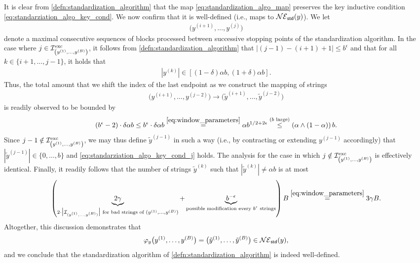 \documentclass[11pt]{amsart}
\numberwithin{equation}{section}
\numberwithin{equation}{section}
\newcommand{\1}{\mathbbm{1}}
\newcommand{\std}{\textup{\textsf{std}}}
\newcommand{\exc}{\textup{exc}}
\theoremstyle{definition}
\begin{document}
It is clear from \cref{defn:standardization_algorithm} that the map \eqref{eq:standardization_algo_map} preserves the key inductive condition \eqref{eq:standarziation_algo_key_cond}. We now confirm that it is well-defined (i.e., maps to $\mathcal{NE}_\std(y)$). We let
\begin{align*}
    \big(y^{(i+1)},\ldots,y^{(j)}\big)
\end{align*}
denote a maximal consecutive sequences of blocks processed between successive stopping points of the standardization algorithm. In the case where $j \in \mathcal I_{\left(y^{(1)}, \dots, y^{(B)}\right)}^\exc$, it follows from \cref{defn:standardization_algorithm} that $|(j-1)-(i+1)+1| \leq b^\epsilon$ and that for all $k \in \{ i+1, \dots, j-1 \}$, it holds that
\begin{align*}
    |y^{(k)}| \in \left[ (1-\delta)\alpha b, (1+\delta)\alpha b \right].
\end{align*}
Thus, the total amount that we shift the index of the last endpoint as we construct the mapping of strings
\begin{align*}
    \big(y^{(i+1)}, \dots, y^{(j-2)}\big) \to \big(\tilde{y}^{(i+1)}, \dots, \tilde{y}^{(j-2)}\big)
\end{align*}
is readily observed to be bounded by
\begin{align} \label{eq:total_shift}
    (b^\epsilon-2) \cdot \delta \alpha b \leq b^\epsilon \cdot \delta \alpha b \stackrel{\eqref{eq:window_parameters}}{=} \alpha b^{1/2+2\epsilon} \stackrel{\text{($b$ large)}}{\leq} \left( \alpha \land (1-\alpha) \right)b.
\end{align}
Since $j-1 \notin \mathcal I_{\left(y^{(1)}, \dots, y^{(B)}\right)}^\exc$, we may thus define $\tilde{y}^{(j-1)}$ in such a way (i.e., by contracting or extending $y^{(j-1)}$ accordingly) that $|\tilde{y}^{(j-1)}| \in \{0, \dots, b\}$ and \eqref{eq:standarziation_algo_key_cond_j} holds. The analysis for the case in which $j \notin \mathcal I_{\left(y^{(1)}, \dots, y^{(B)}\right)}^\exc$ is effectively identical. Finally, it readily follows that the number of strings $\tilde{y}^{(k)}$ such that $|\tilde{y}^{(k)}| \neq \alpha b$ is at most
\begin{align*}
    \left( \underbrace{2\gamma}_{2 \cdot \big|\mathcal I_{(y^{(1)}, \dots, y^{(B)})} \big| \text{ for bad strings of } (y^{(1)}, \dots, y^{(B)})} + \underbrace{b^{-\epsilon}}_{\text{possible modification every $b^\epsilon$ strings}} \right) B \stackrel{\eqref{eq:window_parameters}}{=} 3\gamma B.
\end{align*}
Altogether, this discussion demonstrates that
\begin{align*}
    \varphi_{y}\big(y^{(1)}, \dots, y^{(B)}\big) = \big(\tilde{y}^{(1)}, \dots, \tilde{y}^{(B)}\big) \in \mathcal{NE}_\std(y),
\end{align*}
and we conclude that the standardization algorithm of \cref{defn:standardization_algorithm} is indeed well-defined. 
\end{document}
